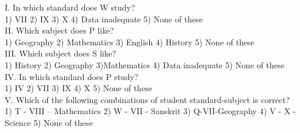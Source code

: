 \documentclass[
]{article}
\begin{document}
I. In which standard does W study?\\
1) VII \hspace{2mm}2) IX \hspace{2mm}3) X
\hspace{2mm}4) Data inadequate \hspace{2mm}5) None of these\\

II. Which subject does P like?\\
1) Geography \hspace{2mm}2) Mathematics \hspace{2mm}3) English
\hspace{2mm}4) History \hspace{2mm}5) None of these\\

III. Which subject does S like?\\
1) History \hspace{2mm}2) Geography \hspace{2mm}3)Mathematics
\hspace{2mm}4) Data inadequate \hspace{2mm}5) None of these\\

IV. In which standard does P study?\\
1) IV \hspace{2mm}2) VII \hspace{2mm}3) IX \hspace{2mm}4) X \hspace{2mm}5) None of these\\

V. Which of the following combinations of student standard-subject is correct?\\
1) T - VIII – Mathematics \hspace{2mm}2) W - VII - Sanskrit \hspace{2mm}3) Q-VII-Geography
\hspace{2mm}4) V - X - Science \hspace{2mm}5) None of these\\
\end{document}
